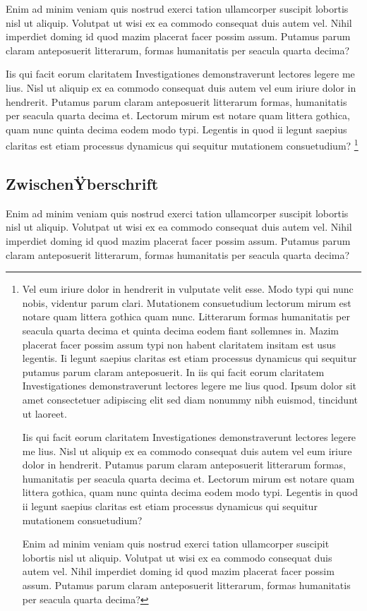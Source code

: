 \documentclass[a4paper,12pt]{scrartcl}
\begin{document}
Enim ad minim veniam quis nostrud exerci tation ullamcorper suscipit lobortis nisl ut aliquip. Volutpat ut wisi ex ea commodo consequat duis autem vel. Nihil imperdiet doming id quod mazim placerat facer possim assum. Putamus parum claram anteposuerit litterarum, formas humanitatis per seacula quarta decima?

Iis qui facit eorum claritatem Investigationes demonstraverunt lectores legere me lius. Nisl ut aliquip ex ea commodo consequat duis autem vel eum iriure dolor in hendrerit. Putamus parum claram anteposuerit litterarum formas, humanitatis per seacula quarta decima et. Lectorum mirum est notare quam littera gothica, quam nunc quinta decima eodem modo typi. Legentis in quod ii legunt saepius claritas est etiam processus dynamicus qui sequitur mutationem consuetudium?
\footnote{Vel eum iriure dolor in hendrerit in vulputate velit esse. Modo typi qui nunc nobis, videntur parum clari. Mutationem consuetudium lectorum mirum est notare quam littera gothica quam nunc. Litterarum formas humanitatis per seacula quarta decima et quinta decima eodem fiant sollemnes in. Mazim placerat facer possim assum typi non habent claritatem insitam est usus legentis. Ii legunt saepius claritas est etiam processus dynamicus qui sequitur putamus parum claram anteposuerit. In iis qui facit eorum claritatem Investigationes demonstraverunt lectores legere me lius quod. Ipsum dolor sit amet consectetuer adipiscing elit sed diam nonummy nibh euismod, tincidunt ut laoreet.

Iis qui facit eorum claritatem Investigationes demonstraverunt lectores legere me lius. Nisl ut aliquip ex ea commodo consequat duis autem vel eum iriure dolor in hendrerit. Putamus parum claram anteposuerit litterarum formas, humanitatis per seacula quarta decima et. Lectorum mirum est notare quam littera gothica, quam nunc quinta decima eodem modo typi. Legentis in quod ii legunt saepius claritas est etiam processus dynamicus qui sequitur mutationem consuetudium?

Enim ad minim veniam quis nostrud exerci tation ullamcorper suscipit lobortis nisl ut aliquip. Volutpat ut wisi ex ea commodo consequat duis autem vel. Nihil imperdiet doming id quod mazim placerat facer possim assum. Putamus parum claram anteposuerit litterarum, formas humanitatis per seacula quarta decima?}

\subsection{ZwischenŸberschrift}
Enim ad minim veniam quis nostrud exerci tation ullamcorper suscipit lobortis nisl ut aliquip. Volutpat ut wisi ex ea commodo consequat duis autem vel. Nihil imperdiet doming id quod mazim placerat facer possim assum. Putamus parum claram anteposuerit litterarum, formas humanitatis per seacula quarta decima?
\end{document}
